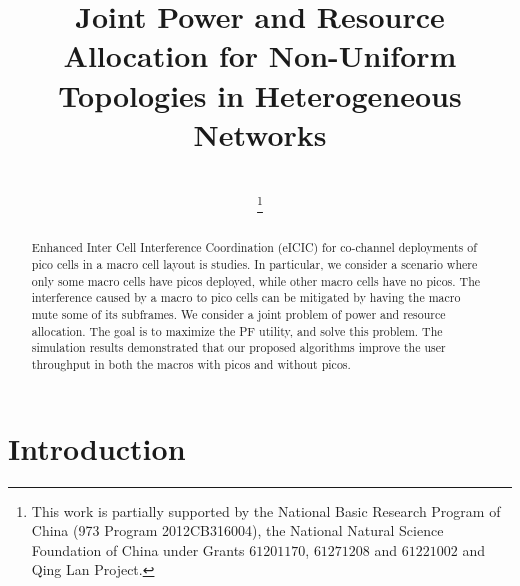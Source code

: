\documentclass[journal]{IEEETran}
\begin{document}
\title{Joint Power and Resource Allocation for Non-Uniform Topologies in Heterogeneous Networks}



\author{\\
\thanks{
This work is partially
supported by the National Basic Research Program of China
(973 Program 2012CB316004), the National Natural Science Foundation of China
under Grants $61201170$, $61271208$ and $61221002$ and Qing Lan Project.}
}

\maketitle

\begin{abstract}
 Enhanced Inter Cell Interference Coordination (eICIC) for co-channel deployments of pico cells in a macro cell layout is studies. In particular, we consider a scenario where only some macro cells have picos deployed, while other macro cells have no picos. The interference caused by a macro to pico cells can be mitigated by having the macro mute some of its subframes. We consider a joint problem of power and resource allocation. The goal is to maximize the PF utility, and solve this problem. The simulation results demonstrated that our proposed algorithms improve the user throughput in both the macros with picos and without picos.
\end{abstract}
\section {Introduction}\label{Introduction}
\end{document}

